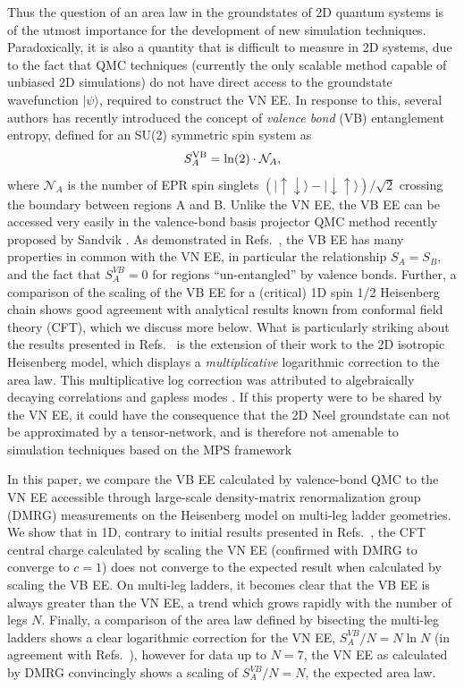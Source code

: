 \documentclass[prl,aps,twocolumn,floatfix,amsmath,amssymb,superscriptaddress,tightenlines]{revtex4}
\begin{document}
Thus the question of an area law in the groundstates of 2D quantum systems is of the utmost importance for the development of new simulation techniques.  Paradoxically, it is also a quantity that is difficult to measure in 2D systems, due to the fact that QMC techniques (currently the only scalable method capable of unbiased 2D simulations) do not have direct access to the groundstate wavefunction $| \psi \rangle$, required to construct the VN EE.  In response to this, several authors \cite{Alet, Chh} has recently introduced the concept of {\it valence bond} (VB) entanglement entropy, defined for an SU(2) symmetric spin system as
\begin{equation}
S^{\rm VB}_A = \ln(2) \cdot \mathcal{N}_A,
\end{equation}
where $ \mathcal{N}_A$ is the number of EPR spin singlets ${( |\uparrow \downarrow \rangle - | \downarrow \uparrow \rangle)/\sqrt{2}}$ crossing the boundary between regions A and B.  Unlike the VN EE, the VB EE can be accessed very easily in the valence-bond basis projector QMC method recently proposed by Sandvik \cite{Sandvik}.  
As demonstrated in Refs.~\cite{Alet,Chh}, the VB EE has many properties in common with the VN EE, in particular the relationship $S_A = S_B$, and the fact that $S^{VB}_A=0$ for regions ``un-entangled'' by valence bonds.  Further, a comparison of the scaling of the VB EE for a (critical) 1D spin 1/2 Heisenberg chain shows good agreement with analytical results known from conformal field theory (CFT), which we discuss more below.
What is particularly striking about the results presented in Refs.~\cite{Alet,Chh} is the extension of their work to the 2D isotropic Heisenberg model, which displays a {\it multiplicative} logarithmic correction to the area law.  This multiplicative log correction was attributed to algebraically decaying correlations \cite{Chh} and gapless modes \cite{Alet}.
 If this property were to be shared by the VN EE, it could have the consequence that the 2D Neel groundstate can not be approximated by a tensor-network, and is therefore not amenable to simulation techniques based on the MPS framework
 
In this paper, we compare the VB EE calculated by valence-bond QMC to the VN EE accessible through large-scale density-matrix renormalization group (DMRG) measurements on the Heisenberg model on multi-leg ladder geometries.    We show that in 1D, contrary to initial results presented in Refs.~\cite{Alet,Chh}, the CFT central charge calculated by scaling the VN EE (confirmed with DMRG to converge to $c=1$) does not converge to the expected result when calculated by scaling the VB EE.  On multi-leg ladders, it becomes clear that the VB EE is always greater than the VN EE, a trend which grows rapidly with the number of legs $N$.  Finally, a comparison of the area law defined by bisecting the multi-leg ladders shows a clear logarithmic correction for the VN EE, $S^{VB}_A /N = N \ln N$ (in agreement with Refs.~\cite{Alet,Chh}), however for data up to $N=7$, the VN EE as calculated by DMRG convincingly shows a scaling of $S^{VB}_A /N = N$, the expected area law.
\end{document}
